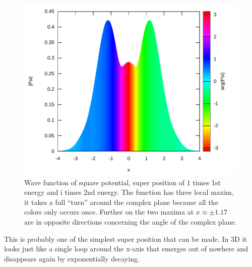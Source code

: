 \documentclass[11pt,DIV=10,final]{scrreprt} %
\newcommand{\mi}{{\text{i}}}
\begin{document}
\begin{minipage}{\textwidth}
\begin{figure}[H]
\centering
\includegraphics[width=\textwidth]{plots/super-square-1_1-2_i.pdf}
\caption{\label{fig:label} Wave function of square potential, super position of $1$ times 1st energy and $\mi$ times 2nd energy. The function has three local maxim, it takes a full ``turn'' around
    the complex plane because all the colors only occurs once. Further on the two maxima at $x \approx \pm 1.17$ are in opposite directions concerning the angle of the complex plane.}
\end{figure}
This is probably one of the simplest super position that can be made. In 3D it looks just like a single loop around the x-axis that emerges out of nowhere and disappears again by exponentially decaying.
\end{minipage}
\end{document}
